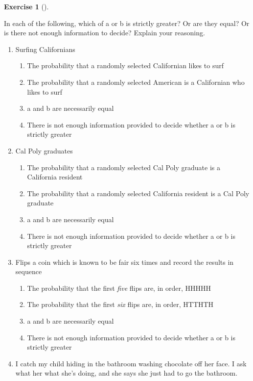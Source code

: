\documentclass[
  letterpaper,
  DIV=11,
  numbers=noendperiod]{scrreprt}
\providecommand{\tightlist}{%
  \setlength{\itemsep}{0pt}\setlength{\parskip}{0pt}}
\theoremstyle{plain}
\theoremstyle{definition}
\theoremstyle{definition}
\newtheorem{exercise}{Exercise}[chapter]
\theoremstyle{definition}
\theoremstyle{remark}
\begin{document}
\begin{exercise}[]\protect\hypertarget{exr-which1}{}\label{exr-which1}

In each of the following, which of a or b is strictly greater? Or are
they equal? Or is there not enough information to decide? Explain your
reasoning.

\begin{enumerate}
\def\labelenumi{\arabic{enumi}.}
\item
  Surfing Californians

  \begin{enumerate}
  \def\labelenumii{\alph{enumii}.}
  \tightlist
  \item
    The probability that a randomly selected Californian likes to surf
  \item
    The probability that a randomly selected American is a Californian
    who likes to surf
  \item
    a and b are necessarily equal
  \item
    There is not enough information provided to decide whether a or b is
    strictly greater
  \end{enumerate}
\item
  Cal Poly graduates

  \begin{enumerate}
  \def\labelenumii{\alph{enumii}.}
  \tightlist
  \item
    The probability that a randomly selected Cal Poly graduate is a
    California resident
  \item
    The probability that a randomly selected California resident is a
    Cal Poly graduate
  \item
    a and b are necessarily equal
  \item
    There is not enough information provided to decide whether a or b is
    strictly greater
  \end{enumerate}
\item
  Flips a coin which is known to be fair six times and record the
  results in sequence

  \begin{enumerate}
  \def\labelenumii{\alph{enumii}.}
  \tightlist
  \item
    The probability that the first \emph{five} flips are, in order,
    HHHHH
  \item
    The probability that the first \emph{six} flips are, in order,
    HTTHTH
  \item
    a and b are necessarily equal
  \item
    There is not enough information provided to decide whether a or b is
    strictly greater
  \end{enumerate}
\item
  I catch my child hiding in the bathroom washing chocolate off her
  face. I ask what her what she's doing, and she says she just had to go
  the bathroom.


\end{enumerate}
\end{exercise}
\end{document}
